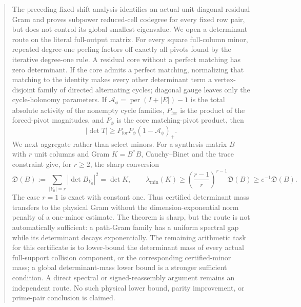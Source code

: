 \begin{abstract}
The preceding fixed-shift analysis identifies an actual unit-diagonal residual
Gram and proves subpower reduced-cell codegree for every fixed row pair, but
does not control its global smallest eigenvalue. We open a determinant route
on the literal full-output matrix. For every square full-column minor, repeated
degree-one peeling factors off exactly all pivots found by the iterative
degree-one rule. A residual core without a perfect matching has zero
determinant. If the core admits a perfect matching, normalizing that matching
to the identity makes every other determinant term a vertex-disjoint family
of directed alternating cycles; diagonal gauge leaves only the
cycle-holonomy parameters. If
\(\mathcal A_\phi=\operatorname{per}(I+|E|)-1\) is the total absolute activity
of the nonempty cycle families, \(P_{\mathrm{for}}\) is the product of the
forced-pivot magnitudes, and \(P_\phi\) is the core matching-pivot product,
then
\[
 |\det T|
 \ge
 P_{\mathrm{for}}P_\phi(1-\mathcal A_\phi)_+.
\]
We next aggregate rather than select minors. For a synthesis matrix \(B\) with
\(r\) unit columns and Gram \(K=B^*B\), Cauchy--Binet and the trace constraint
give, for \(r\ge2\), the sharp conversion
\[
 \mathfrak D(B):=\sum_{|Y_0|=r}|\det B_{Y_0}|^2=\det K,
 \qquad
 \lambda_{\min}(K)
 \ge
 \left(\frac{r-1}{r}\right)^{r-1}\mathfrak D(B)
 \ge e^{-1}\mathfrak D(B).
\]
The case \(r=1\) is exact with constant one.
Thus certified determinant mass transfers to the physical Gram without the
dimension-exponential norm penalty of a one-minor estimate. The theorem is
sharp, but the route is not automatically sufficient: a path-Gram family has
a uniform spectral gap while its determinant decays exponentially. The
remaining arithmetic task for this certificate is to lower-bound the
determinant mass of every actual full-support collision component, or the
corresponding certified-minor mass; a global determinant-mass lower bound is
a stronger sufficient condition. A direct spectral or signed-reassembly
argument remains an independent route. No such physical lower bound, parity
improvement, or prime-pair conclusion is claimed.
\end{abstract}
